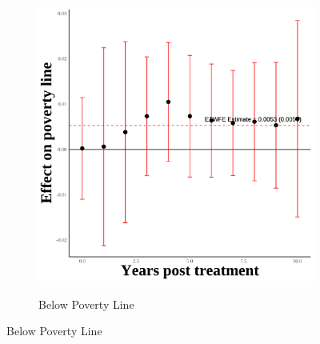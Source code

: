 \documentclass[12pt,english]{article}
\begin{document}
\begin{figure}[H]
\begin{subfigure}[b]{0.3\textwidth}
    \label{fig:snap-third-one}
  \end{subfigure}
  \hfill
  \begin{subfigure}[b]{0.3\textwidth}
    \centering
    \caption{Below Poverty Line}
    \includegraphics[width=\linewidth]{figures/plot62-poverty_line_event_study-third-one.png}
    \label{fig:poverty-line-third-one}
  \end{subfigure}

  \vspace{0.3cm} %


\end{figure}
\end{document}
